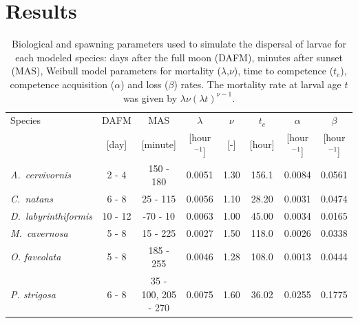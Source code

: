 \documentclass[preprint,12pt,authoryear]{elsarticle}
\begin{document}
	\section*{Results}
	
	\begin{table}
		\begin{adjustwidth}{-1in}{-1in}
			\centering
			\footnotesize
			\begin{tabular}{lccccccc}
				\hline
				Species & DAFM  & MAS      &  $\lambda$     & $\nu$ & $t_c$  & $\alpha$      & $\beta$ \\
				& [day] & [minute] &  [hour$^{-1}$] & [-]   & [hour] & [hour$^{-1}$] & [hour$^{-1}$] \\
				\hline
				\textit{A.~cervivornis} & 2 - 4 & 150 - 180 & 0.0051 & 1.30 & 156.1 & 0.0084 & 0.0561 \\
				\textit{C.~natans}      & 6 - 8 & 25 - 115  &  0.0056 & 1.10 & 28.20 & 0.0031 & 0.0474 \\
				\textit{D.~labyrinthiformis} & 10 - 12 & -70 - 10 & 0.0063 & 1.00 &  45.00 & 0.0034 & 0.0165 \\
				\textit{M.~cavernosa}   & 5 - 8 & 15 - 225 & 0.0027 & 1.50 & 118.0 & 0.0026 & 0.0338 \\
				\textit{O. faveolata}   & 5 - 8 & 185 - 255 &  0.0046 & 1.28 & 108.0 & 0.0013 & 0.0444 \\
				\textit{P. strigosa}    & 6 - 8 &  35 - 100, 205 - 270 & 0.0075 & 1.60 & 36.02 & 0.0255 & 0.1775 \\
				\hline
			\end{tabular}
		\end{adjustwidth}
		\caption{Biological and spawning parameters used to simulate the dispersal of larvae for each modeled species: days after the full moon (DAFM), minutes after sunset (MAS), Weibull model parameters for mortality ($\lambda$,$\nu$), time to competence ($t_c$), competence acquisition ($\alpha$) and loss ($\beta$) rates. The mortality rate at larval age $t$ was given by $\lambda\nu(\lambda t)^{\nu-1}$.}\label{tab:species}
	\end{table}
	
\end{document}
